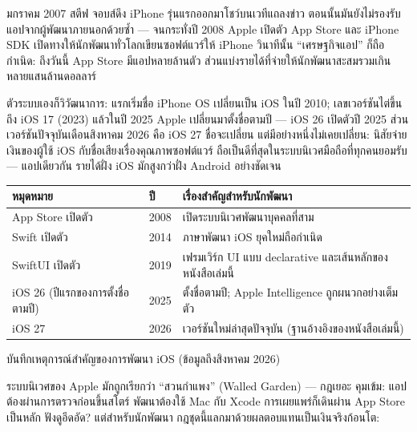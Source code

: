 


มกราคม 2007 สตีฟ จอบส์ดึง iPhone รุ่นแรกออกมาโชว์บนเวทีแถลงข่าว ตอนนั้นมันยังไม่รองรับแอปจากผู้พัฒนาภายนอกด้วยซ้ำ — จนกระทั่งปี 2008 Apple เปิดตัว App Store และ iPhone SDK เปิดทางให้นักพัฒนาทั่วโลกเขียนซอฟต์แวร์ให้ iPhone วินาทีนั้น “เศรษฐกิจแอป” ก็ถือกำเนิด: ถึงวันนี้ App Store มีแอปหลายล้านตัว ส่วนแบ่งรายได้ที่จ่ายให้นักพัฒนาสะสมรวมเกินหลายแสนล้านดอลลาร์

ตัวระบบเองก็วิวัฒนาการ: แรกเริ่มชื่อ iPhone OS เปลี่ยนเป็น iOS ในปี 2010; เลขเวอร์ชันไต่ขึ้นถึง iOS 17 (2023) แล้วในปี 2025 Apple เปลี่ยนมาตั้งชื่อตามปี — iOS 26 เปิดตัวปี 2025 ส่วนเวอร์ชันปัจจุบันเดือนสิงหาคม 2026 คือ iOS 27 ชื่อจะเปลี่ยน แต่มีอย่างหนึ่งไม่เคยเปลี่ยน: นิสัยจ่ายเงินของผู้ใช้ iOS กับชื่อเสียงเรื่องคุณภาพซอฟต์แวร์ ถือเป็นดีที่สุดในระบบนิเวศมือถือที่ทุกคนยอมรับ — แอปเดียวกัน รายได้ฝั่ง iOS มักสูงกว่าฝั่ง Android อย่างชัดเจน

\begin{center}
\begin{tabularx}{\linewidth}{|X|X|X|}
\hline
\textbf{หมุดหมาย} & \textbf{ปี} & \textbf{เรื่องสำคัญสำหรับนักพัฒนา} \tabularnewline
\hline
App Store เปิดตัว & 2008 & เปิดระบบนิเวศพัฒนาบุคคลที่สาม \tabularnewline
Swift เปิดตัว & 2014 & ภาษาพัฒนา iOS ยุคใหม่ถือกำเนิด \tabularnewline
SwiftUI เปิดตัว & 2019 & เฟรมเวิร์ก UI แบบ declarative และเส้นหลักของหนังสือเล่มนี้ \tabularnewline
iOS 26 (ปีแรกของการตั้งชื่อตามปี) & 2025 & ตั้งชื่อตามปี; Apple Intelligence ถูกผนวกอย่างเต็มตัว \tabularnewline
iOS 27 & 2026 & เวอร์ชันใหม่ล่าสุดปัจจุบัน (ฐานอ้างอิงของหนังสือเล่มนี้) \tabularnewline
\hline
\end{tabularx}
\end{center}

\begin{center}\small\color{gray}บันทึกเหตุการณ์สำคัญของการพัฒนา iOS (ข้อมูลถึงสิงหาคม 2026)\end{center}


ระบบนิเวศของ Apple มักถูกเรียกว่า “สวนกำแพง” (Walled Garden) — กฎเยอะ คุมเข้ม: แอปต้องผ่านการตรวจก่อนขึ้นสโตร์ พัฒนาต้องใช้ Mac กับ Xcode การเผยแพร่ก็เดินผ่าน App Store เป็นหลัก ฟังดูอึดอัด? แต่สำหรับนักพัฒนา กฎชุดนี้แลกมาด้วยผลตอบแทนเป็นเงินจริงก้อนโต:


